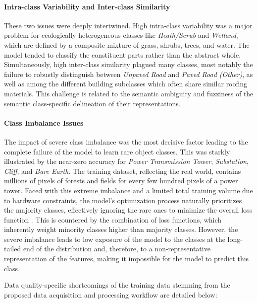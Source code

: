 \documentclass{report}
\begin{document}
\paragraph{Intra-class Variability and Inter-class Similarity} These two issues were deeply intertwined. High intra-class variability was a major problem for ecologically heterogeneous classes like \textit{Heath/Scrub} and \textit{Wetland}, which are defined by a composite mixture of grass, shrubs, trees, and water. The model tended to classify the constituent parts rather than the abstract whole. Simultaneously, high inter-class similarity plagued many classes, most notably the failure to robustly distinguish between \textit{Unpaved Road} and \textit{Paved Road (Other)}, as well as among the different building subclasses which often share similar roofing materials. This challenge is related to the semantic ambiguity and fuzziness of the semantic class-specific delineation of their representations.
\paragraph{Class Imbalance Issues} The impact of severe class imbalance was the most decisive factor leading to the complete failure of the model to learn rare object classes. This was starkly illustrated by the near-zero accuracy for \textit{Power Transmission Tower}, \textit{Substation}, \textit{Cliff}, and \textit{Bare Earth}. The training dataset, reflecting the real world, contains millions of pixels of forests and fields for every few hundred pixels of a power tower. Faced with this extreme imbalance and a limited total training volume due to hardware constraints, the model's optimization process naturally prioritizes the majority classes, effectively ignoring the rare ones to minimize the overall loss function \parencite[p.~7934]{BhatEtAlRobustlossfunctionclassimbalancedsemanticsegmentationimageclassification2023a}. This is countered by the combination of loss functions, which inherently weight minority classes higher than majority classes. However, the severe imbalance leads to low exposure of the model to the classes at the long-tailed end of the distribution and, therefore, to a non-representative representation of the features, making it impossible for the model to predict this class.
\par
Data quality-specific shortcomings of the training data stemming from the proposed data acquisition and processing workflow are detailed below:
\end{document}
